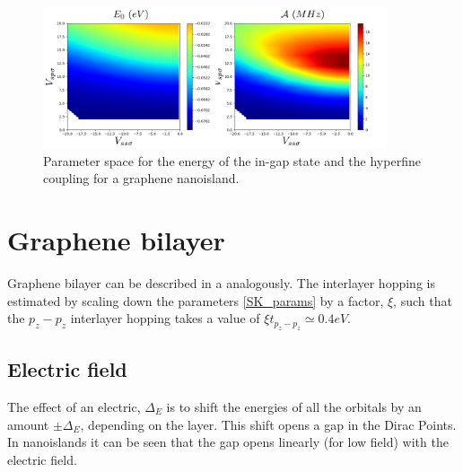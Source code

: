 \begin{figure}[h!]
  \centering
  \includegraphics[width=0.9\textwidth]{defects/fig/parameter_space_mono.pdf}
  \vspace{-5pt}
\caption{Parameter space for the energy of the in-gap state and the hyperfine coupling for a graphene nanoisland.}
\label{SK2d}
\end{figure}
\FloatBarrier







\section{Graphene bilayer}
Graphene bilayer can be described in a analogously. The interlayer hopping is estimated by scaling down the parameters \eqref{SK_params} by a factor, $\xi$, such that the $p_z-p_z$ interlayer hopping takes a value\cite{KatsnelsonBook} of $\xi t_{p_z-p_z}\simeq 0.4eV$.
\subsection{Electric field}
The effect of an electric, $\Delta_E$ is to shift the energies of all the orbitals by an amount $\pm\Delta_E$, depending on the layer. This shift opens a gap in the Dirac Points. In nanoislands it can be seen that the gap opens linearly (for low field) with the electric field.

